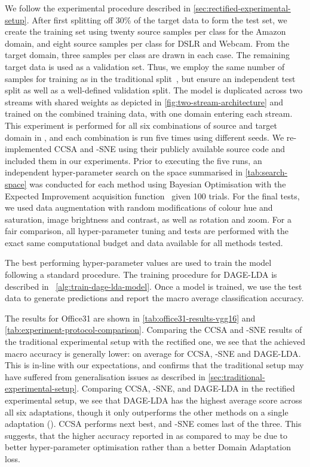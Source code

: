 \documentclass[journal]{IEEEtran}
\begin{document}
We follow the experimental procedure described in \cref{sec:rectified-experimental-setup}. After first splitting off 30\% of the target data to form the test set, we create the training set using twenty source samples per class for the Amazon domain, and eight source samples per class for DSLR and Webcam. From the target domain, three samples per class are drawn in each case. The remaining target data is used as a validation set.
Thus, we employ the same number of samples for training as in the traditional split~\cite{tzeng2015simultaneous, xu2019dsne, motiian2017ccsa}, but ensure an independent test split as well as a well-defined validation split.
The model is duplicated across two streams with shared weights as depicted in \cref{fig:two-stream-architecture} and trained on the combined training data, with one domain entering each stream.
This experiment is performed for all six combinations of source and target domain in , and each combination is run five times using different seeds.
We re-implemented CCSA and -SNE using their publicly available source code and included them in our experiments. Prior to executing the five runs, an independent hyper-parameter search on the space summarised in \cref{tab:search-space} was conducted for each method using Bayesian Optimisation with the Expected Improvement acquisition function~\cite{brochu2010} given 100 trials. For the final tests, we used data augmentation with random modifications of colour hue and saturation, image brightness and contrast, as well as rotation and zoom. For a fair comparison, all hyper-parameter tuning and tests are performed with the exact same computational budget and data available for all methods tested. 

The best performing hyper-parameter values are used to train the model following a standard procedure. The training procedure for DAGE-LDA is described in ~\cref{alg:train-dage-lda-model}. Once a model is trained, we use the test data to generate predictions and report the macro average classification accuracy. 

The results for Office31 are shown in \cref{tab:office31-results-vgg16} and \cref{tab:experiment-protocol-comparison}. 
Comparing the CCSA and -SNE results of the traditional experimental setup with the rectified one, we see that the achieved macro accuracy is generally lower:  on average for CCSA, -SNE and DAGE-LDA. This is in-line with our expectations, and confirms that the traditional setup may have suffered from generalisation issues as described in \cref{sec:traditional-experimental-setup}. Comparing CCSA, -SNE, and DAGE-LDA in the rectified experimental setup, we see that DAGE-LDA has the highest average score across all six adaptations, though it only outperforms the other methods on a single adaptation (). CCSA performs next best, and -SNE comes last of the three. This suggests, that the higher accuracy reported in \cite{xu2019dsne} as compared to \cite{motiian2017ccsa} may be due to better hyper-parameter optimisation rather than a better Domain Adaptation loss.
\end{document}
